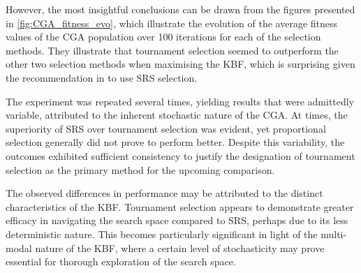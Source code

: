 \documentclass[10pt]{article}
\begin{document}
\begin{multicols}{2}
However, the most insightful conclusions can be drawn from the figures presented in \ref{fig:CGA_fitness_evo}, which illustrate the evolution of the average fitness values of the CGA population over 100 iterations for each of the selection methods. They illustrate that tournament selection seemed to outperform the other two selection methods when maximising the KBF, which is surprising given the recommendation in \cite{parks2023geneticalgorithms} to use SRS selection. 

The experiment was repeated several times, yielding results that were admittedly variable, attributed to the inherent stochastic nature of the CGA. At times, the superiority of SRS over tournament selection was evident, yet proportional selection generally did not prove to perform better. Despite this variability, the outcomes exhibited sufficient consistency to justify the designation of tournament selection as the primary method for the upcoming comparison.

The observed differences in performance may be attributed to the distinct characteristics of the KBF. Tournament selection appears to demonstrate greater efficacy in navigating the search space compared to SRS, perhaps due to its less deterministic nature. This becomes particularly significant in light of the multi-modal nature of the KBF, where a certain level of stochasticity may prove essential for thorough exploration of the search space.

\end{multicols}
\end{document}
